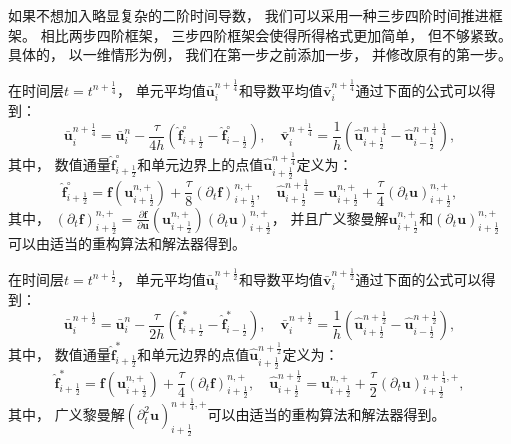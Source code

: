 如果不想加入略显复杂的二阶时间导数，
我们可以采用一种三步四阶时间推进框架。
相比两步四阶框架，
三步四阶框架会使得所得格式更加简单，
但不够紧致。
具体的，
以一维情形为例，
我们在第一步之前添加一步，
并修改原有的第一步。

\vspace{0.3\baselineskip} %
在时间层$t=t^{n+\frac{1}{4}}$，
单元平均值$\bar{\bm{u}}_{i}^{n+\frac{1}{4}}$和导数平均值$\bar{\bm{v}}_{i}^{n+\frac{1}{4}}$通过下面的公式可以得到：
\begin{equation}
  \bar{\bm{u}}_{i}^{n+\frac 14}=\bar{\bm{u}}_{i}^{n}-\frac{\tau}{4 h} \left(\hat{\bm{f}}_{i+\frac 12}^\circ-\hat{\bm{f}}_{i-\frac 12}^\circ\right), \quad
  \bar{\bm{v}}_{i}^{n+\frac 14}=\frac{1}{h} \left(\hat {\bm{u}}_{i+\frac 12}^{n+\frac 14}-\hat {\bm{u}}_{i-\frac 12}^{n+\frac 14}\right),
\end{equation}
其中，
数值通量$\hat{\bm{f}}_{i+\frac 12}^\circ$和单元边界上的点值$\hat {\bm{u}}_{i+\frac 12}^{n+\frac 14}$定义为：
\begin{equation}
  \hat{\bm{f}}^\circ_{i+\frac{1}{2}}={\bm{f}} \left({\bm{u}}_{i+\frac{1}{2}}^{n, +}\right) +\frac{\tau}{8} \left({\partial_{t}}{\bm{f}}\right)_{i+\frac{1}{2}}^{n, +}, \quad
  \hat {\bm{u}}_{i+\frac{1}{2}}^{n+\frac 14}={\bm{u}}_{i+\frac{1}{2}}^{n, +}+\frac{\tau}{4} \left({\partial_{t}}{\bm{u}}\right)_{i+\frac{1}{2}}^{n, +},
\end{equation}
其中，
$\left({\partial_{t}}{\bm{f}}\right)_{i+\frac{1}{2}}^{n, +} = \frac{\partial{\bm{f}}}{\partial{\bm{u}}}\left({\bm{u}}_{i+\frac{1}{2}}^{n, +}\right) \left({\partial_{t}}{\bm{u}}\right)_{i+\frac{1}{2}}^{n, +}$，
并且广义黎曼解${\bm{u}}_{i+\frac{1}{2}}^{n, +}$和$\left({\partial_{t}}{\bm{u}}\right)_{i+\frac{1}{2}}^{n, +}$可以由适当的重构算法和解法器得到。

在时间层$t=t^{n+\frac{1}{2}}$，
单元平均值$\bar{\bm{u}}_{i}^{n+\frac{1}{2}}$和导数平均值$\bar{\bm{v}}_{i}^{n+\frac{1}{2}}$通过下面的公式可以得到：
\begin{equation}
  \bar{\bm{u}}_{i}^{n+\frac 12}=\bar{\bm{u}}_{i}^{n}-\frac{\tau}{2 h} \left(\hat{\bm{f}}_{i+\frac 12}^*-\hat{\bm{f}}_{i-\frac 12}^*\right), \quad
  \bar{\bm{v}}_{i}^{n+\frac 12}=\frac{1}{h} \left(\hat {\bm{u}}_{i+\frac 12}^{n+\frac 12}-\hat {\bm{u}}_{i-\frac 12}^{n+\frac 12}\right),
\end{equation}
其中，
数值通量$\hat{\bm{f}}_{i+\frac 12}^*$和单元边界的点值$\hat {\bm{u}}_{i+\frac 12}^{n+\frac 12}$定义为：
\begin{equation}
  \hat{\bm{f}}^*_{i+\frac{1}{2}}={\bm{f}} \left({\bm{u}}_{i+\frac{1}{2}}^{n, +}\right) +\frac{\tau}{4} \left({\partial_{t}}{\bm{f}}\right)_{i+\frac{1}{2}}^{n, +}, \quad
  \hat {\bm{u}}_{i+\frac{1}{2}}^{n+\frac 12}={\bm{u}}_{i+\frac{1}{2}}^{n, +}+\frac{\tau}{2} \left({\partial_{t}}{\bm{u}}\right)_{i+\frac{1}{2}}^{n+\frac{1}{4}, +},
\end{equation}
其中，
广义黎曼解$\left({\partial_{t}^2}{\bm{u}}\right)_{i+\frac{1}{2}}^{n+\frac{1}{4}, +}$可以由适当的重构算法和解法器得到。

